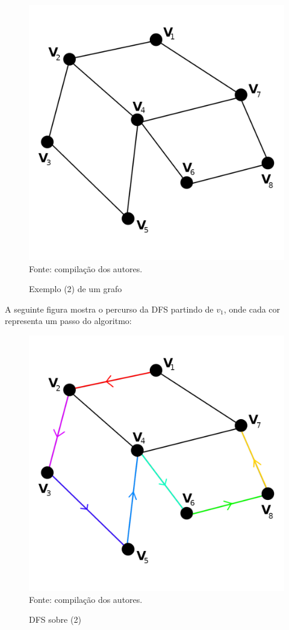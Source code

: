 \documentclass[twocolumn, 10pt]{extarticle}
\begin{document}
\begin{figure}[H]
	\caption{Exemplo (2) de um grafo} 
	\centering
	\includegraphics[scale=0.7]{grafo2}
	\\ Fonte: compilação dos autores.
\end{figure}

A seguinte figura mostra o percurso da DFS partindo de $v_1$, onde cada cor representa um passo do algoritmo:

\begin{figure}[H]
	\caption{DFS sobre (2)} 
	\centering
	\includegraphics[scale=0.7]{dfs1}
	\\ Fonte: compilação dos autores.
\end{figure}
\end{document}
